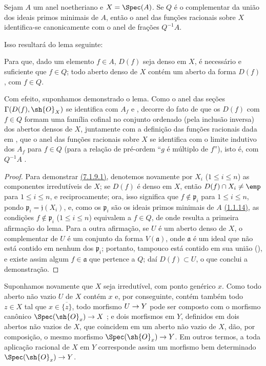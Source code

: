 \documentclass[oneside]{amsart}
\makeatletter
\renewcommand{\leq}{\leqslant}
\newcommand{\ega@arrow}[2]{\mathchoice{#1}{#2}{#2}{#2}}
\renewcommand{\to}{\ega@arrow{\longrightarrow}{\rightarrow}}
\let\EGAOriginalLabel\label
\renewcommand{\label}[1]{\phantomsection\EGAOriginalLabel{#1}}
\makeatother
\begin{document}
\begin{corollary}[7.1.9]
\label{I.7.1.9}
Sejam $A$ um anel noetheriano e $X=\Spec(A)$.
Se $Q$ é o complementar da união dos ideais primos minimais de $A$, então o anel das funções racionais sobre $X$ identifica-se canonicamente com o anel de frações $Q^{-1}A$.
\end{corollary}

Isso resultará do lema seguinte:

\begin{lemma}[7.1.9.1]
\label{I.7.1.9.1}
Para que, dado um elemento $f\in A$, $D(f)$ seja denso em $X$, é necessário e suficiente que $f\in Q$; todo aberto denso de $X$ contém um aberto da forma $D(f)$, com $f\in Q$.
\end{lemma}

Com efeito, suponhamos demonstrado o lema. Como o anel das seções $\Gamma(D(f),\sh{O}_X)$ se identifica com $A_f$  e , decorre do fato de que os $D(f)$ com $f\in Q$ formam uma família cofinal no conjunto ordenado (pela inclusão inversa) dos abertos densos de $X$, juntamente com a definição das funções racionais dada em , que o anel das funções racionais sobre $X$ se identifica com o limite indutivo dos $A_f$ para $f\in Q$ (para a relação de pré-ordem ``$g$ é múltiplo de $f$''), isto é, com $Q^{-1}A$ .

\begin{proof}
Para demonstrar \hyperref[I.7.1.9.1]{(7.1.9.1)}, denotemos novamente por $X_i$ ($1\leq i\leq n$) as componentes irredutíveis de $X$; se $D(f)$ é denso em $X$, então $D(f)\cap X_i\neq\emp$ para $1\leq i\leq n$, e reciprocamente; ora, isso significa que $f\not\in\mathfrak{p}_i$ para $1\leq i\leq n$, pondo $\mathfrak{p}_i=\mathfrak{j}(X_i)$, e, como os $\mathfrak{p}_i$ são os ideais primos minimais de $A$ \hyperref[I.1.1.14]{(1.1.14)}, as condições $f\not\in\mathfrak{p}_i$ ($1\leq i\leq n$) equivalem a $f\in Q$, de onde resulta a primeira afirmação do lema.
Para a outra afirmação, se $U$ é um aberto denso de $X$, o complementar de $U$ é um conjunto da forma $V(\mathfrak{a})$, onde $\mathfrak{a}$ é um ideal que não está contido em nenhum dos $\mathfrak{p}_i$; portanto, tampouco está contido em sua união (\cite[p.~13]{I-10}), e existe assim algum $f\in\mathfrak{a}$ que pertence a $Q$; daí $D(f)\subset U$, o que conclui a demonstração.
\end{proof}

\begin{env}[7.1.10]
\label{I.7.1.10}
Suponhamos novamente que $X$ seja irredutível, com ponto genérico $x$.
Como todo aberto não vazio $U$ de $X$ contém $x$ e, por conseguinte, contém também todo $z\in X$ tal que $x\in\overline{\{z\}}$, todo morfismo $U\to Y$ pode ser composto com o morfismo canônico $\Spec(\sh{O}_x)\to X$ ; e dois morfismos em $Y$, definidos em dois abertos não vazios de $X$, que coincidem em um aberto não vazio de $X$, dão, por composição, o mesmo morfismo $\Spec(\sh{O}_x)\to Y$.
Em outros termos, a toda aplicação racional de $X$ em $Y$ corresponde assim um morfismo bem determinado $\Spec(\sh{O}_x)\to Y$.
\end{env}
\end{document}
